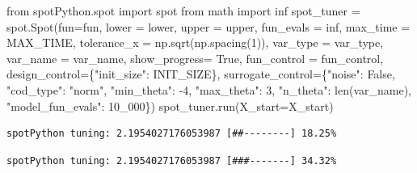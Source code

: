 \documentclass[
  letterpaper,
  DIV=11,
  numbers=noendperiod]{scrreprt}
\newenvironment{Shaded}{\begin{snugshade}}{\end{snugshade}}
\newcommand{\BuiltInTok}[1]{\textcolor[rgb]{0.00,0.23,0.31}{#1}}
\newcommand{\DecValTok}[1]{\textcolor[rgb]{0.68,0.00,0.00}{#1}}
\newcommand{\ImportTok}[1]{\textcolor[rgb]{0.00,0.46,0.62}{#1}}
\newcommand{\NormalTok}[1]{\textcolor[rgb]{0.00,0.23,0.31}{#1}}
\newcommand{\OperatorTok}[1]{\textcolor[rgb]{0.37,0.37,0.37}{#1}}
\newcommand{\StringTok}[1]{\textcolor[rgb]{0.13,0.47,0.30}{#1}}
\newcommand{\VariableTok}[1]{\textcolor[rgb]{0.07,0.07,0.07}{#1}}
\begin{document}
\begin{Shaded}
\begin{Highlighting}[]
\ImportTok{from}\NormalTok{ spotPython.spot }\ImportTok{import}\NormalTok{ spot}
\ImportTok{from}\NormalTok{ math }\ImportTok{import}\NormalTok{ inf}
\NormalTok{spot\_tuner }\OperatorTok{=}\NormalTok{ spot.Spot(fun}\OperatorTok{=}\NormalTok{fun,}
\NormalTok{                   lower }\OperatorTok{=}\NormalTok{ lower,}
\NormalTok{                   upper }\OperatorTok{=}\NormalTok{ upper,}
\NormalTok{                   fun\_evals }\OperatorTok{=}\NormalTok{ inf,}
\NormalTok{                   max\_time }\OperatorTok{=}\NormalTok{ MAX\_TIME,}
\NormalTok{                   tolerance\_x }\OperatorTok{=}\NormalTok{ np.sqrt(np.spacing(}\DecValTok{1}\NormalTok{)),}
\NormalTok{                   var\_type }\OperatorTok{=}\NormalTok{ var\_type,}
\NormalTok{                   var\_name }\OperatorTok{=}\NormalTok{ var\_name,}
\NormalTok{                   show\_progress}\OperatorTok{=} \VariableTok{True}\NormalTok{,}
\NormalTok{                   fun\_control }\OperatorTok{=}\NormalTok{ fun\_control,}
\NormalTok{                   design\_control}\OperatorTok{=}\NormalTok{\{}\StringTok{"init\_size"}\NormalTok{: INIT\_SIZE\},}
\NormalTok{                   surrogate\_control}\OperatorTok{=}\NormalTok{\{}\StringTok{"noise"}\NormalTok{: }\VariableTok{False}\NormalTok{,}
                                      \StringTok{"cod\_type"}\NormalTok{: }\StringTok{"norm"}\NormalTok{,}
                                      \StringTok{"min\_theta"}\NormalTok{: }\OperatorTok{{-}}\DecValTok{4}\NormalTok{,}
                                      \StringTok{"max\_theta"}\NormalTok{: }\DecValTok{3}\NormalTok{,}
                                      \StringTok{"n\_theta"}\NormalTok{: }\BuiltInTok{len}\NormalTok{(var\_name),}
                                      \StringTok{"model\_fun\_evals"}\NormalTok{: }\DecValTok{10\_000}\NormalTok{\})}
\NormalTok{spot\_tuner.run(X\_start}\OperatorTok{=}\NormalTok{X\_start)}
\end{Highlighting}
\end{Shaded}

\begin{verbatim}
spotPython tuning: 2.1954027176053987 [##--------] 18.25% 
\end{verbatim}

\begin{verbatim}
spotPython tuning: 2.1954027176053987 [###-------] 34.32% 
\end{verbatim}
\end{document}
